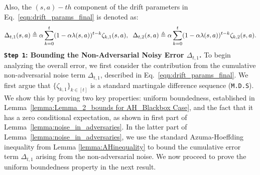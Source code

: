 \documentclass{article}
\begin{document}
Also, the \((s,a)-th\) component of the drift parameters in Eq.~\eqref{eqn:drift_params_final} is denoted as:
\begin{equation}\label{eqn:drift_params_final_element_wise}
     \Delta_{t,1}(s,a) \triangleq \alpha \sum_{k=0}^{t} (1 - \alpha \lambda(s,a))^{t-k} \zeta_{k,1}(s,a) ,\hspace{2mm} \Delta_{t,2}(s,a) \triangleq \alpha \sum_{k=0}^{t} (1 - \alpha \lambda(s,a))^{t-k} \zeta_{k,2}(s,a).
\end{equation}
\textbf{\texttt{Step 1}: Bounding the Non-Adversarial Noisy Error \(\Delta_{t,1}\).} To begin analyzing the overall error, we first consider the contribution from the cumulative non-adversarial noise term \(\Delta_{t,1}\), described in Eq.~\eqref{eqn:drift_params_final}. We first argue that \(\{\zeta_{k,1}\}_{k \in [t]}\) is a standard martingale difference sequence (\texttt{M.D.S}). We show this by proving two key properties: uniform boundedness, established in Lemma~\ref{lemma:Lemma_2_bounds for AH_Blackbox Case}, and the fact that it has a zero conditional expectation, as shown in first part of Lemma~\ref{lemma:noise_in_adversaries}. In the latter part of Lemma~\ref{lemma:noise_in_adversaries}, we use the standard Azuma-Hoeffding inequality from Lemma \ref{lemma:AHinequality} to bound the cumulative error term \(\Delta_{t,1}\) arising from the non-adversarial noise. We now proceed to prove the uniform boundedness property in the next result. 

\end{document}
